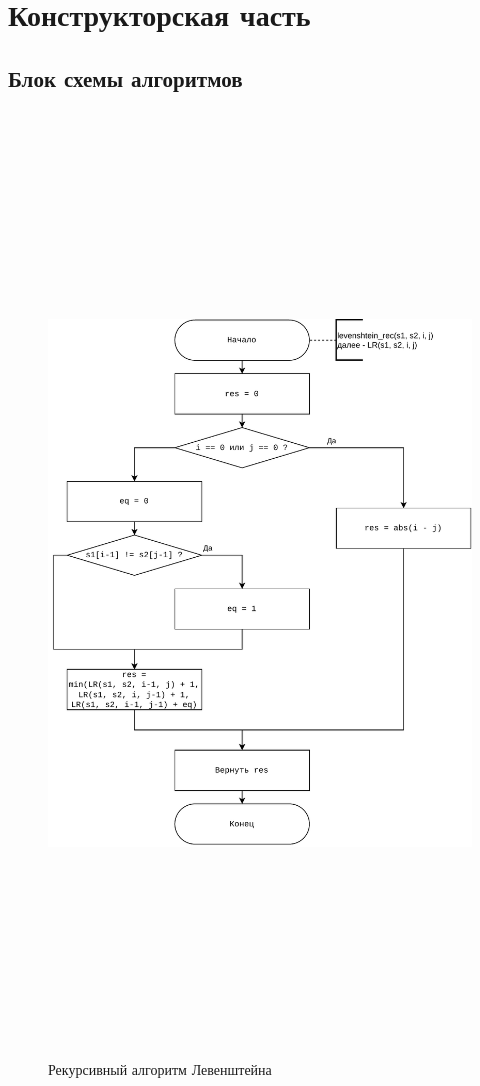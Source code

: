 \chapter{Конструкторская часть}
    
    \section{Блок схемы алгоритмов}
    
        \begin{figure}
            \centering
            \includegraphics[width=15cm,height=25cm,keepaspectratio]{images/leven_rec.pdf}
            \caption{Рекурсивный алгоритм Левенштейна}
            \label{fig:leven_rec}
        \end{figure}
        
